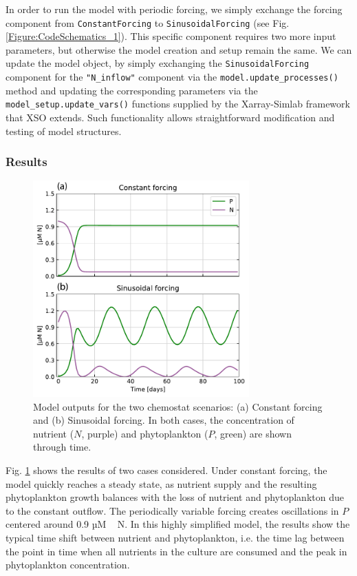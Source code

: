 \documentclass[gmd, manuscript]{copernicus}
\begin{document}
In order to run the model with periodic forcing, we simply exchange the forcing component from \texttt{ConstantForcing} to \texttt{SinusoidalForcing} (see Fig. \ref{Figure:CodeSchematics_1}). This specific component requires two more input parameters, but otherwise the model creation and setup remain the same. We can  update the model object, by simply exchanging the \texttt{SinusoidalForcing} component for the \texttt{"N\_inflow"} component via the \texttt{model.update\_processes()} method and updating the corresponding parameters via the \texttt{model\_setup.update\_vars()} functions supplied by the Xarray-Simlab framework that XSO extends. Such functionality allows straightforward modification and testing of model structures.

\subsubsection{Results}

\begin{figure}[t]
\includegraphics[width=8.3cm]{Figures/firstdraft_plots/01_chemostat_output.pdf}
\caption{Model outputs for the two chemostat scenarios: (a) Constant forcing and (b) Sinusoidal forcing. In both cases, the concentration of nutrient ($N$, purple) and phytoplankton ($P$, green) are shown through time.}
\label{Figure:ResultsChemostat}
\end{figure}

Fig. \ref{Figure:ResultsChemostat} shows the results of two cases considered. Under constant forcing, the model quickly reaches a steady state, as nutrient supply and the resulting phytoplankton growth balances with the loss of nutrient and phytoplankton due to the constant outflow. The periodically variable forcing creates oscillations in $P$ centered around 0.9 \unit{µM\,N}. In this highly simplified model, the results show the typical time shift between nutrient and phytoplankton, i.e. the time lag between the point in time when all nutrients in the culture are consumed and the peak in phytoplankton concentration.
\end{document}
